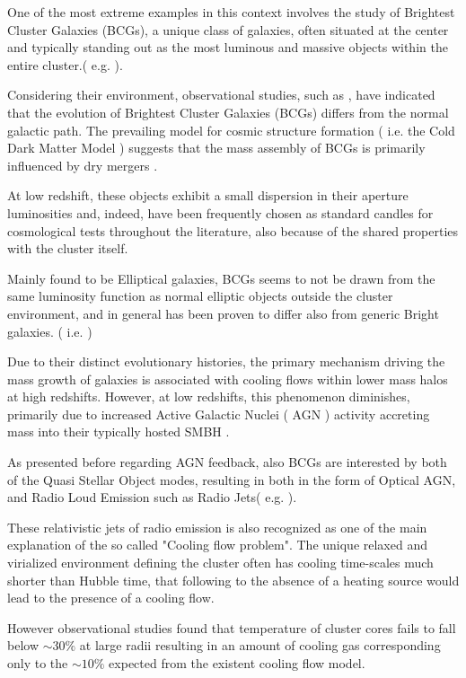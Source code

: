 One of the most extreme examples in this context involves the study of Brightest Cluster Galaxies (BCGs), a unique class of galaxies, often situated at the center and typically standing out as the most luminous and massive objects within the entire cluster.( e.g. \cite{2015MNRAS.448....2W} ).

Considering their environment, observational studies, such as \cite{2020MNRAS.498.2719T}, have indicated that the evolution of Brightest Cluster Galaxies (BCGs) differs from the normal galactic path. The prevailing model for cosmic structure formation ( i.e. the Cold Dark Matter Model ) suggests that the mass assembly of BCGs is primarily influenced by dry mergers \cite{2007MNRAS.375....2D, 2019ApJ...881..150C}.

At low redshift, these objects exhibit a small dispersion in their aperture luminosities and, indeed, have been frequently chosen as standard candles for cosmological tests throughout the literature, also because of the shared properties with the cluster itself.

Mainly found to be Elliptical galaxies, BCGs seems to not be drawn from the same luminosity function as normal elliptic objects outside the cluster environment, and in general has been proven to differ also from generic Bright galaxies.
 ( i.e. \cite{1977ApJ...212..311T}) 
  
Due to their distinct evolutionary histories, the primary mechanism driving the mass growth of galaxies is associated with cooling flows within lower mass halos at high redshifts. However, at low redshifts, this phenomenon diminishes, primarily due to increased Active Galactic Nuclei ( AGN ) activity accreting mass into their typically hosted SMBH \cite{2006ApJ...652..216R}.
 
As presented before regarding AGN feedback, also BCGs are interested by both of the Quasi Stellar Object modes, resulting in both in the form of Optical AGN, and Radio Loud Emission such as Radio Jets( e.g. \cite{2007MNRAS.379..867V} ).

These relativistic jets of radio emission is also recognized as one of the main explanation of the so called "Cooling flow problem". The unique relaxed and virialized environment defining the cluster often has cooling time-scales much shorter than Hubble time, that following to the absence of a heating source would lead to the presence of a cooling flow.

However observational studies found that temperature of cluster cores fails to fall below $\sim 30\%$ at large radii resulting in an amount of cooling gas corresponding only to the $\sim 10\%$ expected from the existent cooling flow model. \cite{David_2001}

